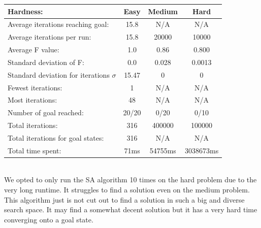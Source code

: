 \documentclass[12pt, a4paper]{article}
\begin{document}
\begin{center}
  \begin{tabular}{| l | c c c|}
    \hline
    Hardness: &\textbf{Easy} & \textbf{Medium} & \textbf{Hard} \\ \hline
    Average iterations reaching goal: & 15.8& N/A & N/A\\
    Average iterations per run:  & 15.8 & 20000 & 10000\\
    Average F value: & 1.0 & 0.86 & 0.800\\
    Standard deviation of F: & 0.0 & 0.028 & 0.0013\\
    Standard deviation for iterations $\sigma$ & 15.47 & 0 & 0\\
    Fewest iterations: & 1 & N/A & N/A\\ 
    Most iterations: & 48 & N/A& N/A\\ 
    Number of goal reached: & 20/20 & 0/20 & 0/10\\
    Total iterations: & 316 & 400000& 100000\\
    Total iterations for goal states: & 316 & N/A& N/A\\
    Total time spent: & 71ms & 54755ms & 3038673ms\\
    \hline
  \end{tabular}
\end{center}
\noindent
\\
We opted to only run the SA algorithm 10 times on the hard problem due to the very long runtime. It struggles to find a solution even on the medium problem. This algorithm just is not cut out to find a solution in such a big and diverse search space. It may find a somewhat decent solution but it has a very hard time converging onto a goal state.
\end{document}
